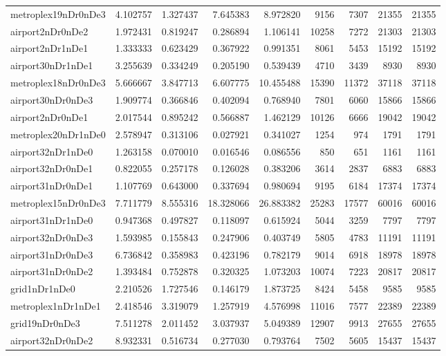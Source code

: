 \begin{longtable}{|l|r|r|r|r|r|r|r|r|}
metroplex19nDr0nDe3 & 4.102757 & 1.327437 & 7.645383 & 8.972820 & 9156 & 7307 & 21355 & 21355 \\
airport2nDr0nDe2 & 1.972431 & 0.819247 & 0.286894 & 1.106141 & 10258 & 7272 & 21303 & 21303 \\
airport2nDr1nDe1 & 1.333333 & 0.623429 & 0.367922 & 0.991351 & 8061 & 5453 & 15192 & 15192 \\
airport30nDr1nDe1 & 3.255639 & 0.334249 & 0.205190 & 0.539439 & 4710 & 3439 & 8930 & 8930 \\
metroplex18nDr0nDe3 & 5.666667 & 3.847713 & 6.607775 & 10.455488 & 15390 & 11372 & 37118 & 37118 \\
airport30nDr0nDe3 & 1.909774 & 0.366846 & 0.402094 & 0.768940 & 7801 & 6060 & 15866 & 15866 \\
airport2nDr0nDe1 & 2.017544 & 0.895242 & 0.566887 & 1.462129 & 10126 & 6666 & 19042 & 19042 \\
metroplex20nDr1nDe0 & 2.578947 & 0.313106 & 0.027921 & 0.341027 & 1254 & 974 & 1791 & 1791 \\
airport32nDr1nDe0 & 1.263158 & 0.070010 & 0.016546 & 0.086556 & 850 & 651 & 1161 & 1161 \\
airport32nDr0nDe1 & 0.822055 & 0.257178 & 0.126028 & 0.383206 & 3614 & 2837 & 6883 & 6883 \\
airport31nDr0nDe1 & 1.107769 & 0.643000 & 0.337694 & 0.980694 & 9195 & 6184 & 17374 & 17374 \\
metroplex15nDr0nDe3 & 7.711779 & 8.555316 & 18.328066 & 26.883382 & 25283 & 17577 & 60016 & 60016 \\
airport31nDr1nDe0 & 0.947368 & 0.497827 & 0.118097 & 0.615924 & 5044 & 3259 & 7797 & 7797 \\
airport32nDr0nDe3 & 1.593985 & 0.155843 & 0.247906 & 0.403749 & 5805 & 4783 & 11191 & 11191 \\
airport31nDr0nDe3 & 6.736842 & 0.358983 & 0.423196 & 0.782179 & 9014 & 6918 & 18978 & 18978 \\
airport31nDr0nDe2 & 1.393484 & 0.752878 & 0.320325 & 1.073203 & 10074 & 7223 & 20817 & 20817 \\
grid1nDr1nDe0 & 2.210526 & 1.727546 & 0.146179 & 1.873725 & 8424 & 5458 & 9585 & 9585 \\
metroplex1nDr1nDe1 & 2.418546 & 3.319079 & 1.257919 & 4.576998 & 11016 & 7577 & 22389 & 22389 \\
grid19nDr0nDe3 & 7.511278 & 2.011452 & 3.037937 & 5.049389 & 12907 & 9913 & 27655 & 27655 \\
airport32nDr0nDe2 & 8.932331 & 0.516734 & 0.277030 & 0.793764 & 7502 & 5605 & 15437 & 15437 \\

\end{longtable}
